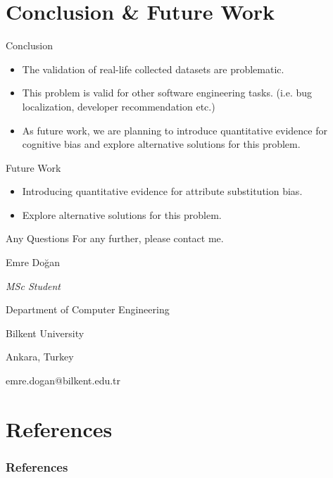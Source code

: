 \documentclass{beamer}
\begin{document}
\section{Conclusion \& Future Work}
\begin{frame}{Conclusion}

\begin{itemize}
    \item The validation of real-life collected datasets are problematic.
    \item This problem is valid for other software engineering tasks. (i.e. bug localization, developer recommendation etc.)
    \item As future work, we are planning to introduce quantitative evidence for cognitive bias and explore alternative solutions for this problem.
\end{itemize}
\end{frame}

\begin{frame}{Future Work}

\begin{itemize}
    \item Introducing quantitative evidence for attribute substitution bias.
    \item Explore alternative solutions for this problem.
\end{itemize}
\end{frame}
\begin{frame}{Any Questions}
\centering \Large For any further, please contact me.

\centering \normalsize Emre Doğan

\centering \small \textit{MSc Student}

\centering \small Department of Computer Engineering

\centering \small Bilkent University 

\centering \small Ankara, Turkey

emre.dogan@bilkent.edu.tr
\end{frame}



\section{References}
\begingroup
\Tiny
\begin{frame}[allowframebreaks]
    \frametitle{References}
    
     
\end{frame}
\endgroup
\end{document}
